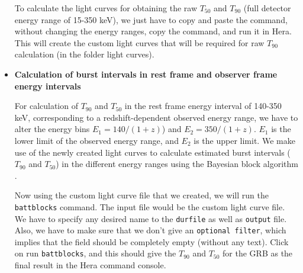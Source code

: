 \documentclass[prd,nofootinbib,preprintnumbers,floatfix]{revtex4}  %
\begin{document}
\begin{itemize}
To calculate the light curves for obtaining the raw $T_{50}$ and $T_{90}$ (full detector energy range of 15-350 keV), we just have to copy and paste the command, without changing the energy ranges, copy the command, and run it in Hera. This will create the custom light curves that will be required for raw $T_{90}$ calculation (in the folder light curves).

\item \textbf{Calculation of burst intervals in rest frame and observer frame energy intervals}

For calculation of $T_{90}$ and $T_{50}$ in the rest frame energy interval of 140-350 keV, corresponding to a redshift-dependent  observed energy range, we have to alter the energy bins $E_{1}=140/(1+z)$) and $E_{2}=350/(1+z)$. $E_{1}$ is the lower limit of the observed energy range, and $E_{2}$ is the upper limit.
We make use of the newly created light curves to calculate estimated burst intervals ($T_{90}$ and $T_{50}$) in the different energy ranges using the Bayesian block algorithm \cite{scargle2013bayesian}.


Now using the custom light curve file that we created, we will run the {\tt battblocks} command. The input file would be the custom light curve file. We have to specify any desired name to the {\tt durfile} as well as {\tt output} file. Also, we have to make sure that we don't give an {\tt optional filter}, which implies that the field should be completely empty (without any text). Click on run {\tt battblocks}, and this should give the $T_{90}$ and $T_{50}$ for the GRB as the final result in the Hera command console. 
\end{itemize}

\iffalse
\begin{figure}[h]
    \texttt{[image: Plots/Dataprocessing/battblocks.pdf]}
    
    \texttt{[image: Plots/Dataprocessing/battblocks\_output.pdf]}
    \caption{Figures showing the implementation of {\tt battblocks}  command which is used to estimate interesting time intervals (GTIs) based on time variable event or rate data. It does this using the Bayesian Block algorithm, which is intended to robustly compute the time intervals based on Bayesian analysis \cite{scargle2013bayesian}. The first image shows the required settings and input variables for {\tt battblocks} command for our chosen GRB, whereas the second image shows the output of that command, in the command output console.} 
    \label{fig:battblocks}
\end{figure}
\fi
\end{document}
